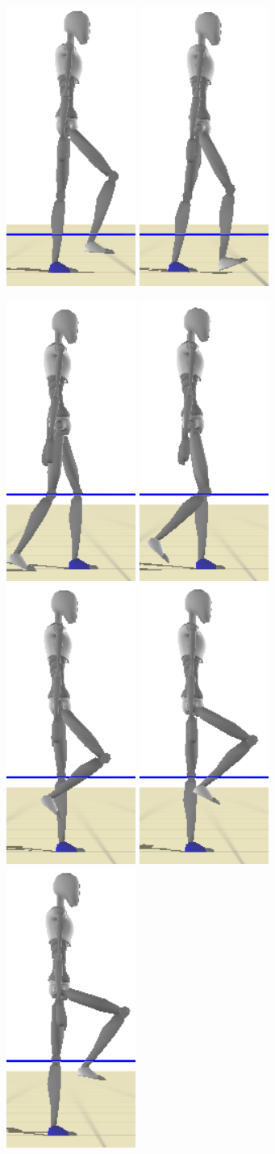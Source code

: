 \documentclass[runningheads,a4paper,10pt]{llncs}
\begin{document}
\begin{figure}[t]
\begin{minipage}{0.4\columnwidth}
\includegraphics[width=0.101\columnwidth]{images/strips/0_25/7.png}
\includegraphics[width=0.101\columnwidth]{images/strips/0_25/8.png}

\includegraphics[width=0.101\columnwidth]{images/strips/0_5/1.png}
\includegraphics[width=0.101\columnwidth]{images/strips/0_5/2.png}
\includegraphics[width=0.101\columnwidth]{images/strips/0_5/3.png}
\includegraphics[width=0.101\columnwidth]{images/strips/0_5/4.png}
\includegraphics[width=0.101\columnwidth]{images/strips/0_5/5.png}

\end{minipage}
\end{figure}
\end{document}
